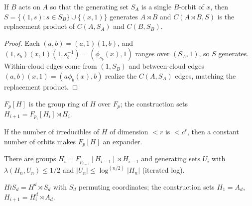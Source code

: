 \begin{theorem}
  \label{thm:alw}
  If $B$ acts on $A$ so that the generating set $S_A$ is a single $B$-orbit of
  $x$, then $S=\{(1,s):s\in S_B\}\cup\{(x,1)\}$ generates $A\rtimes B$ and
  $C(A\rtimes B,S)$ is the replacement product of $C(A,S_A)$ and $C(B,S_B)$.
\end{theorem}
\begin{proof}
  Each $(a,b)=(a,1)(1,b)$, and $(1,s_b)(x,1)(1,s_b^{-1})=(\phi_{s_b}(x),1)$ ranges
  over $(S_A,1)$, so $S$ generates. Within-cloud edges come from $(1,S_B)$ and
  between-cloud edges $(a,b)(x,1)=(a\phi_b(x),b)$ realize the $C(A,S_A)$ edges,
  matching the replacement product.
\end{proof}

\begin{definition}
  \label{def:group-ring}
  \mathlibok
  $F_p[H]$ is the group ring of $H$ over $F_p$; the construction sets
  $H_{i+1}=F_{p_i}[H_i]\rtimes H_i$.
\end{definition}

\begin{theorem}
  \label{thm:mw-condition}
  \notready
  If the number of irreducibles of $H$ of dimension $<r$ is $<c^r$, then a
  constant number of orbits makes $F_p[H]$ an expander.
\end{theorem}

\begin{theorem}
  \label{thm:mw-expanders}
  \notready
  There are groups $H_i=F_{p_{i-1}}[H_{i-1}]\rtimes H_{i-1}$ and generating sets
  $U_i$ with $\lambda(H_n,U_n)\le1/2$ and
  $|U_n|\le\log^{(n/2)}|H_n|$ (iterated log).
\end{theorem}

\begin{definition}
  \label{def:wreath}
  $H\wr S_d=H^d\rtimes S_d$ with $S_d$ permuting coordinates; the construction
  sets $H_1=A_d$, $H_{i+1}=H_i^d\rtimes A_d$.
\end{definition}

